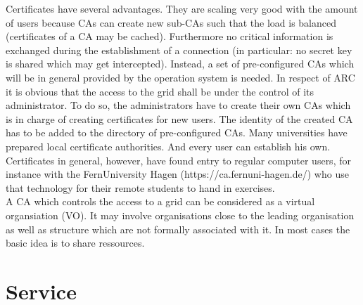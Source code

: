Certificates have several advantages.
They are scaling very good with the amount of users because CAs can create new sub-CAs such that the load is balanced (certificates of a CA may be cached).
Furthermore no critical information is exchanged during the establishment of a connection (in particular: no secret key is shared which may get intercepted).
Instead, a set of pre-configured CAs which will be in general provided by the operation system is needed.
In respect of ARC it is obvious that the access to the grid shall be under the control of its administrator.
To do so, the administrators have to create their own CAs which is in charge of creating certificates for new users.
The identity of the created CA has to be added to the directory of pre-configured CAs.
Many universities have prepared local certificate authorities. And every user can establish his own. Certificates in general, however, have found entry to regular computer users, for instance with the FernUniversity Hagen (https://ca.fernuni-hagen.de/) who use that technology for their remote students to hand in exercises.\\


A CA which controls the access to a grid can be considered as a virtual organsiation (VO).
It may involve organisations close to the leading organisation as well as structure which are not formally associated with it.
In most cases the basic idea is to share ressources. 

\clearpage
\section{Service}


